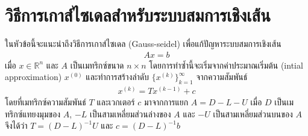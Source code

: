 \section{วิธีการเกาส์ไซเดลสำหรับระบบสมการเชิงเส้น}


\hspace{1cm}  ในหัวข้อนี้จะแนะนำถึงวิธีการเกาส์ไซเดล (Gauss-seidel) เพื่อแก้ปัญหาระบบสมการเชิงเส้น 
\begin{align}
    Ax = b
    \label{equation:linearquation_system}
\end{align}
เมื่อ $x \in \mathbb{R}^{n}$ และ $A$ เป็นเมทริกซ์ขนาด $n \times n$ โดยการทำซ้ำนี้จะเริ่มจากค่าประมาณเริ่มต้น (intial approximation) $x^{(0)}$ และทำการสร้างลำดับ $\{ x^{(k)} \}_{k=1}^\infty$ จากความสัมพันธ์
\begin{align}
    x^{(k)} = Tx^{(k-1)} + c
\end{align}
โดยที่เมทริกซ์ความสัมพันธ์ $T$ และเวกเตอร์ $c$ มาจากการแยก $A = D - L - U$ เมื่อ $D$ เป็นเมทริกซ์แทยงมุมของ $A$, $-L$ เป็นสามเหลี่ยมส่วนล่างของ $A$ และ $-U$ เป็นสามเหลี่ยมส่วนบนของ $A$ จึงได้ว่า $T = (D-L)^{-1}U$ และ $c = (D-L)^{-1}b$